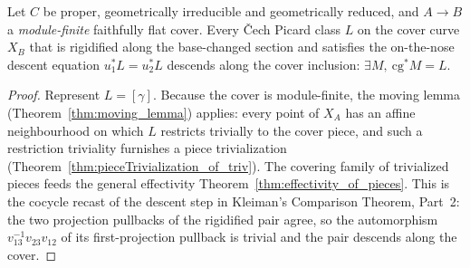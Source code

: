 \begin{theorem}
  \label{thm:effectivity}
  \leanok
  Let \(C\) be proper, geometrically irreducible and geometrically reduced, and \(A \to B\) a
  \emph{module-finite} faithfully flat cover. Every \v Cech Picard class \(L\) on the cover curve
  \(X_B\) that is rigidified along the base-changed section and satisfies the on-the-nose descent
  equation \(u_1^{*}L = u_2^{*}L\) descends along the cover inclusion: \(\exists M,\ \mathrm{cg}^{*}M
  = L\).
\end{theorem}
\begin{proof}
  \leanok
  Represent \(L = [\gamma]\). Because the cover is module-finite, the moving lemma
  (Theorem~\ref{thm:moving_lemma}) applies: every point of \(X_A\) has an affine neighbourhood on
  which \(L\) restricts trivially to the cover piece, and such a restriction triviality furnishes a
  piece trivialization (Theorem~\ref{thm:pieceTrivialization_of_triv}). The covering family of
  trivialized pieces feeds the general effectivity Theorem~\ref{thm:effectivity_of_pieces}. This is
  the cocycle recast of the descent step in Kleiman's Comparison Theorem, Part~2: the two projection
  pullbacks of the rigidified pair agree, so the automorphism \(v_{13}^{-1}v_{23}v_{12}\) of its
  first-projection pullback is trivial and the pair descends along the cover.
\end{proof}

